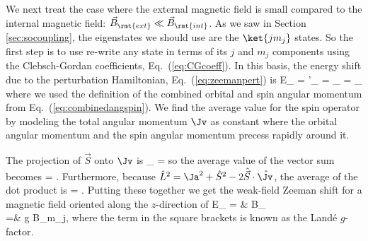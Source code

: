 We next treat the case where the external magnetic field is small compared to the internal magnetic field: $\vec{B}_\rmt{ext} \ll \vec{B}_\rmt{int}$. As we saw in Section \ref{sec:socoupling}, the eigenstates we should use are the $\ket{jm_j}$ states. So the first step is to use re-write any state in terms of its $j$ and $m_j$ components using the Clebsch-Gordan coefficients, Eq.~(\ref{eq:CGcoeff}). In this basis, the energy shift due to the perturbation Hamiltonian, Eq.~(\ref{eq:zeemanpert}) is
\beq
E_ = '_ = _\cdot{} = _\cdot{}
\eeq
where we used the definition of the combined orbital and spin angular momentum from Eq.~(\ref{eq:combinedangspin}). We find the average value for the spin operator by modeling the total angular momentum $\Jv$ as constant where the orbital angular momentum and the spin angular momentum precess rapidly around it.%
\begin{marginfigure}
\centering
{}
\end{marginfigure}%
The projection of $\vec{S}$ onto $\Jv$ is 
\beq
{}_ = \Jv
\eeq
so the average value of the vector sum becomes
\beq
{} = .
\eeq
Furthermore, because $\hat{L}^2 = \Ja^2 + \hat{S}^2 - 2\hat{\vec{S}}\cdot\skew{4}\hat{\Jv} $, the average of the dot product is 
\beq
{} = \left[j(j+1) + s(s+1) - l(l+1)\right].
\eeq{}
Putting these together we get the weak-field Zeeman shift for a magnetic field oriented along the $z$-direction of 
\bas
E_ = & B_\\
=& g B_m_j,
\label{eq:weakfieldzeeman}
\eas
where the term in the square brackets is known as the Land\'{e} $g$-factor. 

